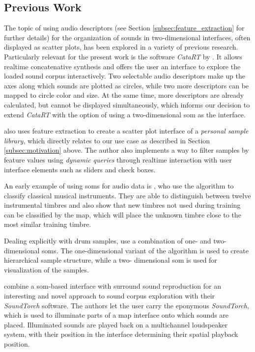 \subsection{Previous Work}
\label{subsec:previous_work}
The topic of using audio descriptors (see Section
\ref{subsec:feature_extraction} for further details) for the organization of
sounds in two-dimensional interfaces, often displayed as scatter plots, has
been explored in a variety of previous research. Particularly relevant for the
present work is the software \textit{CataRT} by \citet{schwarz2006}. It allows
realtime concatenative synthesis and offers the user an interface to explore
the loaded sound corpus interactively. Two selectable audio descriptors make up
the axes along which sounds are plotted as circles, while two more descriptors
can be mapped to circle color and size. At the same time, more descriptors are
already calculated, but cannot be displayed simultaneously, which informs our
decision to extend \textit{CataRT} with the option of using a two-dimensional
\gls{som} as the interface.

\citet{coleman2007} also uses feature extraction to create a scatter plot
interface of a \textit{personal sample library}, which directly relates to our
use case as described in Section \ref{subsec:motivation} above. The author
also implements a way to filter samples by feature values using
\textit{dynamic queries} through realtime interaction with user interface
elements such as sliders and check boxes.

An early example of using \glspl{som} for audio data is \citet{cosi1994}, who
use the algorithm to classify classical musical instruments. They are able to
distinguish between twelve instrumental timbres and also show that new timbres
not used during training can be classified by the map, which will place the
unknown timbre close to the most similar training timbre.

\smallskip

Dealing explicitly
with drum samples, \citet{pampalk2004} use a combination of one- and two-
dimensional \glspl{som}. The one-dimensional variant of the algorithm is used
to create hierarchical sample structure, while a two- dimensional \gls{som} is
used for visualization of the samples.

\smallskip

\citet{heise2008} combine a \gls{som}-based interface with surround sound
reproduction for an interesting and novel approach to sound corpus exploration
with their \textit{SoundTorch} software. The authors let the user carry the
eponymous \textit{SoundTorch}, which is used to illuminate parts of a map
interface onto which sounds are placed. Illuminated sounds are played back on a
multichannel loudspeaker system, with their position in the interface
determining their spatial playback position.


